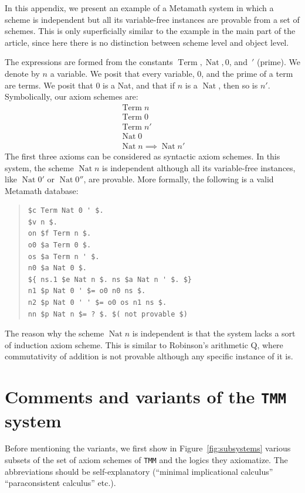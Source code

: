 \documentclass[11pt]{article}
\newcommand*{\rimplies}{\implies}
\DeclareMathOperator{\Term}{Term}
\DeclareMathOperator{\Nat}{Nat}
\theoremstyle{plain}
\theoremstyle{definition}
\theoremstyle{remark}
\begin{document}
In this appendix, we present an example of a Metamath system in which a scheme is independent
but all its variable-free instances are provable from a set of schemes. This is only
superficially similar to the example in the main part of the article, since here there is no
distinction between scheme level and object level.

The expressions are formed from the constants $\Term, \Nat, 0$, and~$'$ (prime).
We denote by $n$ a variable.
We posit that every variable, 0, and the prime of a term are terms.
We posit that 0 is a Nat, and that if $n$ is a $\Nat$, then so is $n'$.
Symbolically, our axiom schemes are:
\begin{gather*}
\Term n\\
\Term 0\\
\Term n'\\
\Nat 0\\
\Nat n \rimplies \Nat n'
\end{gather*}
The first three axioms can be considered as syntactic axiom schemes.
In this system, the scheme $\Nat n$ is independent although all its variable-free instances,
like $\Nat 0'$ or $\Nat 0''$, are provable.
More formally, the following is a valid Metamath database:
\begin{quote}
\begin{verbatim}
$c Term Nat 0 ' $.
$v n $.
on $f Term n $.
o0 $a Term 0 $.
os $a Term n ' $.
n0 $a Nat 0 $.
${ ns.1 $e Nat n $. ns $a Nat n ' $. $}
n1 $p Nat 0 ' $= o0 n0 ns $.
n2 $p Nat 0 ' ' $= o0 os n1 ns $.
nn $p Nat n $= ? $. $( not provable $)
\end{verbatim}
\end{quote}

The reason why the scheme $\Nat n$ is independent is that the system lacks a sort of induction
axiom scheme. This is similar to Robinson's arithmetic Q, where commutativity of addition is not
provable although any specific instance of it is.




\section{Comments and variants of the \texttt{TMM} system}
\label{app:variants}

Before mentioning the variants, we first show in Figure~\ref{fig:subsystems} various subsets
of the set of axiom schemes of \texttt{TMM} and the logics they axiomatize. The abbreviations
should be self-explanatory (``minimal implicational calculus\rlap{,}'' ``paraconsistent
calculus\rlap{,}'' etc.).
\end{document}
